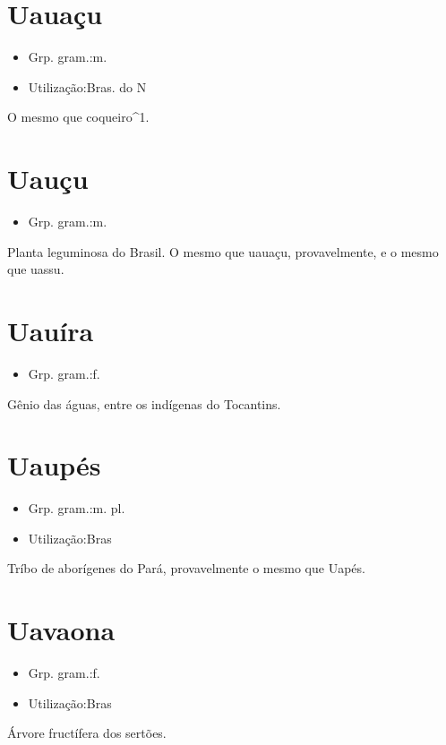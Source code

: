 \documentclass{article}
\begin{document}
\section{Uauaçu}
\begin{itemize}
\item {Grp. gram.:m.}
\end{itemize}
\begin{itemize}
\item {Utilização:Bras. do N}
\end{itemize}
O mesmo que \textunderscore coqueiro\textunderscore ^1.
\section{Uauçu}
\begin{itemize}
\item {Grp. gram.:m.}
\end{itemize}
Planta leguminosa do Brasil.
O mesmo que \textunderscore uauaçu\textunderscore , provavelmente, e o mesmo que \textunderscore uassu\textunderscore .
\section{Uauíra}
\begin{itemize}
\item {Grp. gram.:f.}
\end{itemize}
Gênio das águas, entre os indígenas do Tocantins.
\section{Uaupés}
\begin{itemize}
\item {Grp. gram.:m. pl.}
\end{itemize}
\begin{itemize}
\item {Utilização:Bras}
\end{itemize}
Tríbo de aborígenes do Pará, provavelmente o mesmo que \textunderscore Uapés\textunderscore .
\section{Uavaona}
\begin{itemize}
\item {Grp. gram.:f.}
\end{itemize}
\begin{itemize}
\item {Utilização:Bras}
\end{itemize}
Árvore fructífera dos sertões.
\end{document}
